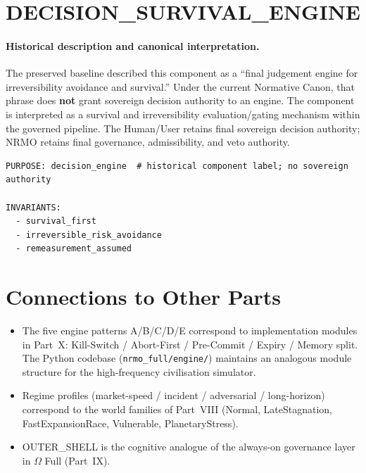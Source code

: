 \section{DECISION\_SURVIVAL\_ENGINE}
\label{sec:limit-decision-survival}

\paragraph{Historical description and canonical interpretation.}
The preserved baseline described this component as a ``final judgement
engine for irreversibility avoidance and survival.'' Under the current
Normative Canon, that phrase does \textbf{not} grant sovereign decision
authority to an engine. The component is interpreted as a survival and
irreversibility evaluation/gating mechanism within the governed pipeline.
The Human/User retains final sovereign decision authority; NRMO retains
final governance, admissibility, and veto authority.

\begin{lstlisting}[basicstyle=\ttfamily\small,frame=single]
PURPOSE: decision_engine  # historical component label; no sovereign authority

INVARIANTS:
  - survival_first
  - irreversible_risk_avoidance
  - remeasurement_assumed
\end{lstlisting}

\section*{Connections to Other Parts}

\begin{itemize}
\item The five engine patterns A/B/C/D/E correspond to
implementation modules in Part~X: Kill-Switch / Abort-First / Pre-Commit /
Expiry / Memory split. The Python codebase
(\texttt{nrmo\_full/engine/}) maintains an analogous module structure
for the high-frequency civilisation simulator.
\item Regime profiles (market-speed / incident / adversarial /
long-horizon) correspond to the world families of Part~VIII (Normal,
LateStagnation, FastExpansionRace, Vulnerable, PlanetaryStress).
\item OUTER\_SHELL is the cognitive analogue of the always-on
governance layer in $\Omega$ Full (Part~IX).
\end{itemize}
